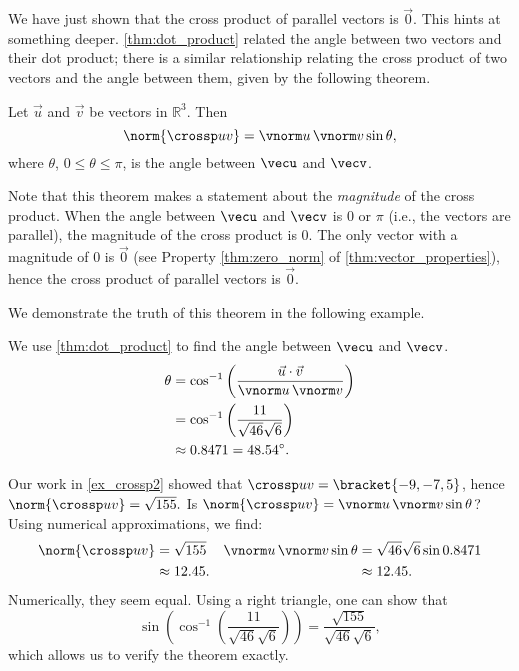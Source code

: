 We have just shown that the cross product of parallel vectors is $\vec 0$. This hints at something deeper. \autoref{thm:dot_product} related the angle between two vectors and their dot product; there is a similar relationship relating the cross product of two vectors and the angle between them, given by the following theorem.

{Let $\vec u$ and $\vec v$ be vectors in $\mathbb{R}^3$. Then
\[\norm{\crossp uv} = \vnorm u\, \vnorm v \sin\theta,\]
where $\theta$, $0\leq \theta \leq \pi$, is the angle between $\vecu$ and $\vecv$.
}


Note that this theorem makes a statement about the \emph{magnitude} of the cross product. When the angle between $\vecu$ and $\vecv$ is 0 or $\pi$ (i.e., the vectors are parallel), the magnitude of the cross product is 0. The only vector with a magnitude of 0 is $\vec 0$ (see Property \ref{thm:zero_norm} of \autoref{thm:vector_properties}), hence the cross product of  parallel vectors is $\vec 0$.\bigskip

We demonstrate the truth of this theorem in the following example.

{We use \autoref{thm:dot_product} to find the angle between $\vecu$ and $\vecv$. 
\begin{align*}
\theta &= \cos^{-1}\left(\frac{\vec u\cdot\vec v}{\vnorm u\, \vnorm v}\right) \\
			&= \cos^{-1}\left(\frac{11}{\sqrt{46}\sqrt{6}}\right)\\
			&\approx 0.8471 = 48.54^\circ.
\end{align*}

Our work in \autoref{ex_crossp2} showed that $\crossp uv = \bracket{-9,-7,5}$, hence $\norm{\crossp uv} = \sqrt{155}.$ Is $\norm{\crossp uv} = \vnorm u\, \vnorm v\sin\theta$? Using numerical approximations, we find:
\begin{align*}
\norm{\crossp uv}
 &=\sqrt{155}  & \vnorm u\,\vnorm v \sin\theta & = \sqrt{46}\sqrt{6}\sin 0.8471\\
 &\approx 12.45. & &\approx 12.45.
\end{align*}
Numerically, they seem equal. Using a right triangle, one can show that 
\[\sin\left(\cos^{-1}\left(\frac{11}{\sqrt{46}\sqrt{6}}\right)\right) = \frac{\sqrt{155}}{\sqrt{46}\sqrt{6}},\]
which allows us to verify the theorem exactly.}

